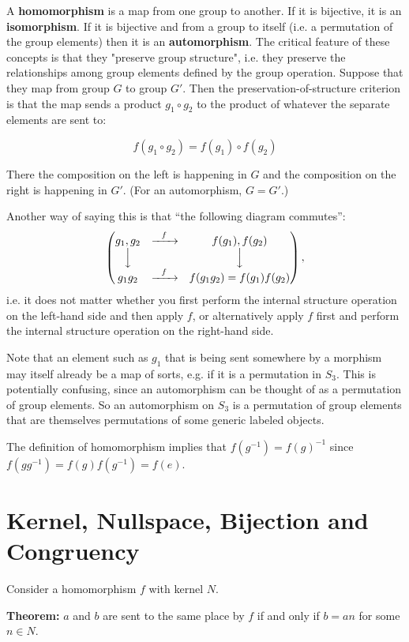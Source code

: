 A \textbf{homomorphism} is a map from one group to another. If it is bijective,
it is an \textbf{isomorphism}. If it is bijective and from a group to itself
(i.e. a permutation of the group elements) then it is an
\textbf{automorphism}. The critical feature of these concepts is that they
"preserve group structure", i.e. they preserve the relationships among group
elements defined by the group operation. Suppose that they map from group $G$
to group $G'$. Then the preservation-of-structure criterion is that the map
sends a product $g_1 \circ g_2$ to the product of whatever the separate
elements are sent to:

$$
f(g_1 \circ g_2) = f(g_1) \circ f(g_2)
$$

There the composition on the left is happening in $G$ and the composition on
the right is happening in $G'$. (For an automorphism, $G=G'$.)

Another way of saying this is that ``the following diagram commutes'':
\begin{align*}
  \begin{pmatrix}g_1, g_2 & \xrightarrow{~~f~~} & f(g_1), f(g_2)\\\Big\downarrow &  & \Big\downarrow\\g_1g_2 & \xrightarrow{~~f~~} & f(g_1g_2) = f(g_1)f(g_2)\\ \end{pmatrix},
\end{align*}
i.e. it does not matter whether you first perform the internal structure operation on the left-hand
side and then apply $f$, or alternatively apply $f$ first and perform the internal structure
operation on the right-hand side.

Note that an element such as $g_1$ that is being sent somewhere by a morphism
may itself already be a map of sorts, e.g. if it is a permutation in
$S_3$. This is potentially confusing, since an automorphism can be thought of
as a permutation of group elements. So an automorphism on $S_3$ is a
permutation of group elements that are themselves permutations of some generic
labeled objects.

The definition of homomorphism implies that $f(g^{-1}) = f(g)^{-1}$ since
$f(gg^{-1}) = f(g)f(g^{-1}) = f(e)$.

\section{Kernel, Nullspace, Bijection and Congruency}

Consider a homomorphism $f$ with kernel $N$.

\textbf{Theorem:} $a$ and $b$ are sent to the same place by $f$ if and only if
$b = an$ for some $n \in N$.

